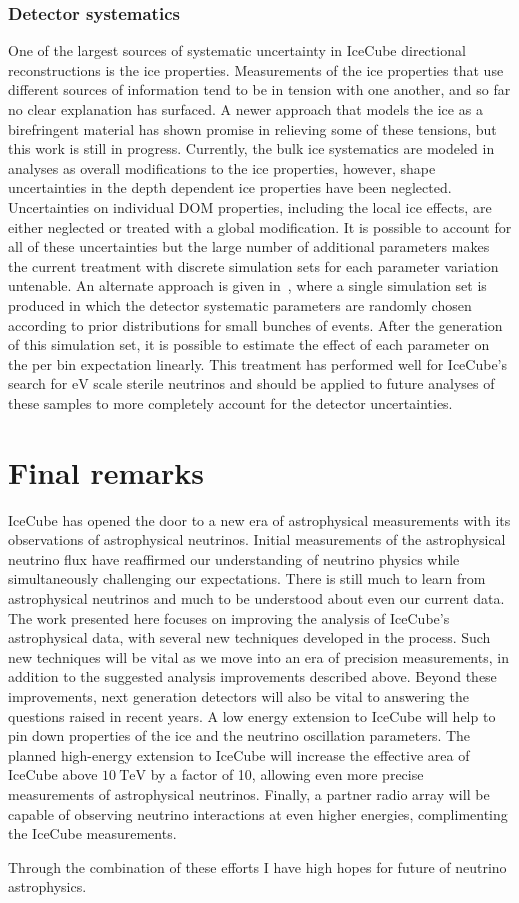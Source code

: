 \subsubsection{Detector systematics}
One of the largest sources of systematic uncertainty in IceCube directional reconstructions is the ice properties.
Measurements of the ice properties that use different sources of information tend to be in tension with one another, and so far no clear explanation has surfaced.
A newer approach that models the ice as a birefringent material has shown promise in relieving some of these tensions, but this work is still in progress.
Currently, the bulk ice systematics are modeled in analyses as overall modifications to the ice properties, however, shape uncertainties in the depth dependent ice properties have been neglected.
Uncertainties on individual DOM properties, including the local ice effects, are either neglected or treated with a global modification.
It is possible to account for all of these uncertainties but the large number of additional parameters makes the current treatment with discrete simulation sets for each parameter variation untenable.
An alternate approach is given in~\cite{Aartsen:2019jcj}, where a single simulation set is produced in which the detector systematic parameters are randomly chosen according to prior distributions for small bunches of events.
After the generation of this simulation set, it is possible to estimate the effect of each parameter on the per bin expectation linearly.
This treatment has performed well for IceCube's search for $\si\eV$ scale sterile neutrinos and should be applied to future analyses of these samples to more completely account for the detector uncertainties.

\section{Final remarks}
IceCube has opened the door to a new era of astrophysical measurements with its observations of astrophysical neutrinos.
Initial measurements of the astrophysical neutrino flux have reaffirmed our understanding of neutrino physics while simultaneously challenging our expectations.
There is still much to learn from astrophysical neutrinos and much to be understood about even our current data.
The work presented here focuses on improving the analysis of IceCube's astrophysical data, with several new techniques developed in the process.
Such new techniques will be vital as we move into an era of precision measurements, in addition to the suggested analysis improvements described above.
Beyond these improvements, next generation detectors will also be vital to answering the questions raised in recent years.
A low energy extension to IceCube will help to pin down properties of the ice and the neutrino oscillation parameters.
The planned high-energy extension to IceCube will increase the effective area of IceCube above $\SI{10}\TeV$ by a factor of 10, allowing even more precise measurements of astrophysical neutrinos.
Finally, a partner radio array will be capable of observing neutrino interactions at even higher energies, complimenting the IceCube measurements.

Through the combination of these efforts I have high hopes for future of neutrino astrophysics.
